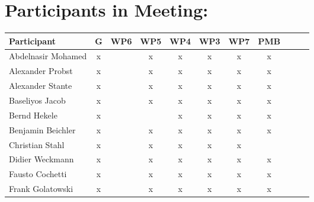 \documentclass[a4paper, 11pt]{article}
\begin{document}
\section{Participants in Meeting:}

\begin{tabular}{|l|c|c|c|c||c|c|c||c|c|c|}
\hline
\textbf{Participant}  & \textbf{G} & \textbf{WP6} &  \textbf{WP5} & \textbf{WP4}&  \textbf{WP3} & \textbf{WP7}&  \textbf{PMB} \\\hline
Abdelnasir Mohamed    & x  &   &x  & x & x & x & x \\\hline 
Alexander Probst     & x &  & x & x & x & x & x  \\\hline  
Alexander Stante     &  x &   &  x  & x & x & x & x \\\hline 
Baseliyos Jacob      & x  &   & x & x & x & x & x \\\hline 
Bernd Hekele         &  x &   &  & x & x & x & x \\\hline
Benjamin Beichler    & x  &   & x  &  x &  x &  x & x  \\\hline
Christian Stahl      & x  &   & x & x & x & x  &   \\\hline
Didier Weckmann      & x  &  & x & x  &  x & x  & x  \\\hline
Fausto Cochetti      & x  &   & x & x & x & x & x \\\hline
Frank Golatowski      & x  &   & x & x & x & x & x \\\hline

\end{tabular}
\end{document}
